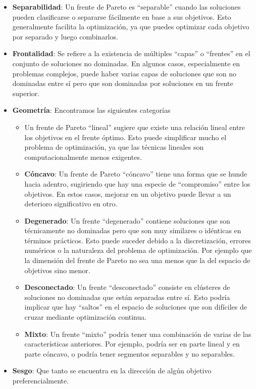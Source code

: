 \begin{itemize}
    \item \textbf{Separabilidad}: Un frente de Pareto es ``separable'' cuando las soluciones pueden clasificarse o separarse fácilmente en base a sus objetivos. Esto generalmente facilita la optimización, ya que puedes optimizar cada objetivo por separado y luego combinarlos.
    
    \item \textbf{Frontalidad}: Se refiere a la existencia de múltiples ``capas'' o ``frentes'' en el conjunto de soluciones no dominadas. En algunos casos, especialmente en problemas complejos, puede haber varias capas de soluciones que son no dominadas entre sí pero que son dominadas por soluciones en un frente superior.
    
    \item \textbf{Geometría}: Encontramos las siguientes categorías \begin{itemize}
        \item    Un frente de Pareto ``lineal'' sugiere que existe una relación lineal entre los objetivos en el frente óptimo. Esto puede simplificar mucho el problema de optimización, ya que las técnicas lineales son computacionalmente menos exigentes.
        
        \item \textbf{Cóncavo}: Un frente de Pareto ``cóncavo'' tiene una forma que se hunde hacia adentro, sugiriendo que hay una especie de ``compromiso'' entre los objetivos. En estos casos, mejorar en un objetivo puede llevar a un deterioro significativo en otro.
        
        \item \textbf{Degenerado}: Un frente ``degenerado'' contiene soluciones que son técnicamente no dominadas pero que son muy similares o idénticas en términos prácticos. Esto puede suceder debido a la discretización, errores numéricos o la naturaleza del problema de optimización. Por ejemplo que la dimensión del frente de Pareto no sea una menos que la del espacio de objetivos sino menor. 
        
        \item \textbf{Desconectado}: Un frente ``desconectado'' consiste en clústeres de soluciones no dominadas que están separadas entre sí. Esto podría implicar que hay ``saltos'' en el espacio de soluciones que son difíciles de cruzar mediante optimización continua.
        
        \item \textbf{Mixto}: Un frente ``mixto'' podría tener una combinación de varias de las características anteriores. Por ejemplo, podría ser en parte lineal y en parte cóncavo, o podría tener segmentos separables y no separables.
    \end{itemize}
    \item \textbf{Sesgo}: Que tanto se encuentra en la dirección de algún objetivo preferencialmente. 
\end{itemize}



